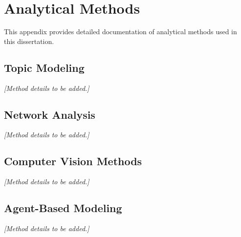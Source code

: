 \documentclass[../main.tex]{subfiles}
\begin{document}
\chapter{Analytical Methods}

This appendix provides detailed documentation of analytical methods used in this dissertation.

\section{Topic Modeling}

\textit{[Method details to be added.]}

\section{Network Analysis}

\textit{[Method details to be added.]}

\section{Computer Vision Methods}

\textit{[Method details to be added.]}

\section{Agent-Based Modeling}

\textit{[Method details to be added.]}
\end{document}
